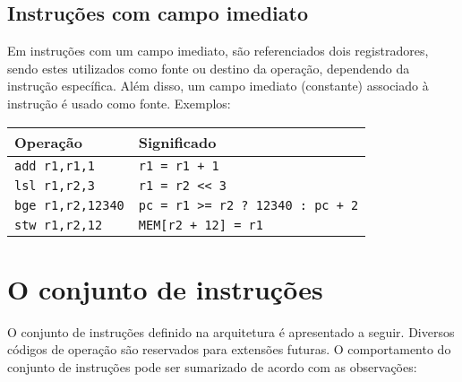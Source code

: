 \documentclass[11pt,a4paper]{report}
\begin{document}
\subsection{Instruções com campo imediato}

Em instruções com um campo imediato, são referenciados dois registradores,
sendo estes utilizados como fonte ou destino da operação, dependendo
da instrução específica. Além disso, um campo imediato (constante)
associado à instrução é usado como fonte. Exemplos:

\begin{table}[htb!]
\centering
\begin{tabular}{|p{5.0cm}|p{8.0cm}|}
\hline
\bf{Operação} & \bf{Significado} \\ \hline \hline
\texttt{add r1,r1,1} & \verb|r1 = r1 + 1| \\ \hline
\texttt{lsl r1,r2,3} & \verb|r1 = r2 << 3| \\ \hline
\texttt{bge r1,r2,12340} & \verb|pc = r1 >= r2 ? 12340 : pc + 2| \\ \hline
\texttt{stw r1,r2,12} & \verb|MEM[r2 + 12] = r1| \\ \hline
\end{tabular}
\end{table}


\section{O conjunto de instruções}

O conjunto de instruções definido na arquitetura é apresentado a seguir.
Diversos códigos de operação são reservados para extensões futuras. O
comportamento do conjunto de instruções pode ser sumarizado de acordo
com as observações:
\end{document}
